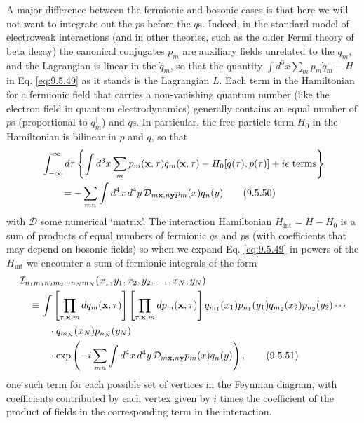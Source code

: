 A major difference between the fermionic and bosonic cases is that here we
will not want to integrate out the $p$s before the $q$s. Indeed, in the
standard model of electroweak interactions (and in other theories, such as the
older Fermi theory of beta decay) the canonical conjugates $p_m$ are auxiliary
fields unrelated to the $q_m$, and the Lagrangian is linear in the $\dot q_m$,
so that the quantity $\int d^3x\sum_mp_m\dot q_m-H$ in Eq. \eqref{eq:9.5.49} as it
stands is the Lagrangian $L$. Each term in the Hamiltonian for a fermionic
field that carries a non-vanishing quantum number (like the electron field in
quantum electrodynamics) generally contains an equal number of $p$s
(proportional to $q_m^\dagger$) and $q$s. In particular, the free-particle term
$H_0$ in the Hamiltonian is bilinear in $p$ and $q$, so that
\begin{align}
&\int_{-\infty}^{\infty}d\tau
 \left\{\int d^3x\sum_mp_m(\mathbf{x},\tau)\dot q_m(\mathbf{x},\tau)
 -H_0[q(\tau),p(\tau)]+i\epsilon\text{ terms}\right\}
\notag\\
&\qquad=-\sum_{mn}\int d^4x\,d^4y\,
 \mathcal{D}_{m\mathbf{x},n\mathbf{y}}p_m(x)q_n(y)
\tag{9.5.50}\label{eq:9.5.50}
\end{align}
with $\mathcal{D}$ some numerical `matrix'. The interaction Hamiltonian
$H_{\mathrm{int}}=H-H_0$ is a sum of products of equal numbers of fermionic
$q$s and $p$s (with coefficients that may depend on bosonic fields) so when we
expand Eq. \eqref{eq:9.5.49} in powers of the $H_{\mathrm{int}}$ we encounter a sum of
fermionic integrals of the form
\begin{align}
&\mathcal{I}_{n_1m_1n_2m_2\cdots n_Nm_N}
 (x_1,y_1,x_2,y_2,\ldots,x_N,y_N)
\notag\\
&\quad\equiv\int
 \left[\prod_{\tau,\mathbf{x},m}dq_m(\mathbf{x},\tau)\right]
 \left[\prod_{\tau,\mathbf{x},m}dp_m(\mathbf{x},\tau)\right]
 q_{m_1}(x_1)p_{n_1}(y_1)q_{m_2}(x_2)p_{n_2}(y_2)\cdots
\notag\\
&\qquad\quad\cdot q_{m_N}(x_N)p_{n_N}(y_N)
\notag\\
&\qquad\quad\cdot
 \exp\left(-i\sum_{mn}\int d^4x\,d^4y\,
 \mathcal{D}_{m\mathbf{x},n\mathbf{y}}p_m(x)q_n(y)\right),
\tag{9.5.51}\label{eq:9.5.51}
\end{align}
one such term for each possible set of vertices in the Feynman diagram, with
coefficients contributed by each vertex given by $i$ times the coefficient of
the product of fields in the corresponding term in the interaction.

